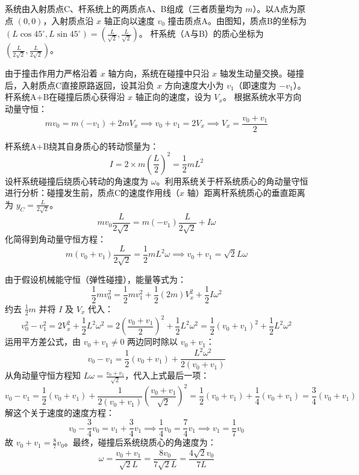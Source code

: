 \begin{solution}
系统由入射质点C、杆系统上的两质点A、B组成（三者质量均为 $m$）。以A点为原点 $(0,0)$，入射质点沿 $x$ 轴正向以速度 $v_0$ 撞击质点A。由图知，质点B的坐标为 $(L \cos 45^\circ, L \sin 45^\circ) = \left( \frac{L}{\sqrt{2}}, \frac{L}{\sqrt{2}} \right)$。
杆系统（A与B）的质心坐标为 $\left( \frac{L}{2\sqrt{2}}, \frac{L}{2\sqrt{2}} \right)$。

由于撞击作用力严格沿着 $x$ 轴方向，系统在碰撞中只沿 $x$ 轴发生动量交换。碰撞后，入射质点C直接原路返回，设其沿负 $x$ 方向速度大小为 $v_1$（即速度为 $-v_1$）。杆系统A+B在碰撞后质心获得沿 $x$ 轴正向的速度，设为 $V_x$。
根据系统水平方向动量守恒：
$$ m v_0 = m (-v_1) + 2m V_x \implies v_0 + v_1 = 2 V_x \implies V_x = \frac{v_0 + v_1}{2} $$

杆系统A+B绕其自身质心的转动惯量为：
$$ I = 2 \times m \left( \frac{L}{2} \right)^2 = \frac{1}{2} m L^2 $$
设杆系统碰撞后绕质心转动的角速度为 $\omega$。利用系统关于杆系统质心的角动量守恒进行分析：碰撞发生前，质点C的速度作用线（$x$ 轴）距离杆系统质心的垂直距离为 $y_C = \frac{L}{2\sqrt{2}}$。
$$ m v_0 \frac{L}{2\sqrt{2}} = m (-v_1) \frac{L}{2\sqrt{2}} + I \omega $$
化简得到角动量守恒方程：
$$ m (v_0 + v_1) \frac{L}{2\sqrt{2}} = \frac{1}{2} m L^2 \omega \implies v_0 + v_1 = \sqrt{2} L \omega $$

由于假设机械能守恒（弹性碰撞），能量等式为：
$$ \frac{1}{2} m v_0^2 = \frac{1}{2} m v_1^2 + \frac{1}{2} (2m) V_x^2 + \frac{1}{2} I \omega^2 $$
约去 $\frac{1}{2}m$ 并将 $I$ 及 $V_x$ 代入：
$$ v_0^2 - v_1^2 = 2 V_x^2 + \frac{1}{2} L^2 \omega^2 = 2 \left( \frac{v_0 + v_1}{2} \right)^2 + \frac{1}{2} L^2 \omega^2 = \frac{1}{2} (v_0 + v_1)^2 + \frac{1}{2} L^2 \omega^2 $$
运用平方差公式，由 $v_0 + v_1 \neq 0$ 两边同时除以 $v_0 + v_1$：
$$ v_0 - v_1 = \frac{1}{2} (v_0 + v_1) + \frac{L^2 \omega^2}{2(v_0 + v_1)} $$
从角动量守恒方程知 $L \omega = \frac{v_0 + v_1}{\sqrt{2}}$，代入上式最后一项：
$$ v_0 - v_1 = \frac{1}{2} (v_0 + v_1) + \frac{1}{2(v_0 + v_1)} \left( \frac{v_0 + v_1}{\sqrt{2}} \right)^2 = \frac{1}{2} (v_0 + v_1) + \frac{1}{4} (v_0 + v_1) = \frac{3}{4} (v_0 + v_1) $$
解这个关于速度的速度方程：
$$ v_0 - \frac{3}{4} v_0 = v_1 + \frac{3}{4} v_1 \implies \frac{1}{4} v_0 = \frac{7}{4} v_1 \implies v_1 = \frac{1}{7} v_0 $$
故 $v_0 + v_1 = \frac{8}{7} v_0$。最终，碰撞后系统绕质心的角速度为：
$$ \omega = \frac{v_0 + v_1}{\sqrt{2} L} = \frac{8 v_0}{7 \sqrt{2} L} = \frac{4\sqrt{2} v_0}{7 L} $$
\end{solution}

